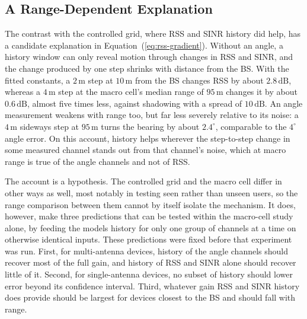 \subsection{A Range-Dependent Explanation}
\label{subsec:hypothesis}

The contrast with the controlled grid, where RSS and SINR history did help, has a candidate explanation in Equation~(\ref{eq:rss-gradient}). Without an angle, a history window can only reveal motion through changes in RSS and SINR, and the change produced by one step shrinks with distance from the BS. With the fitted constants, a $2\,\text{m}$ step at $10\,\text{m}$ from the BS changes RSS by about $2.8\,\text{dB}$, whereas a $4\,\text{m}$ step at the macro cell's median range of $95\,\text{m}$ changes it by about $0.6\,\text{dB}$, almost five times less, against shadowing with a spread of $10\,\text{dB}$. An angle measurement weakens with range too, but far less severely relative to its noise: a $4\,\text{m}$ sideways step at $95\,\text{m}$ turns the bearing by about $2.4^\circ$, comparable to the $4^\circ$ angle error. On this account, history helps wherever the step-to-step change in some measured channel stands out from that channel's noise, which at macro range is true of the angle channels and not of RSS.

The account is a hypothesis. The controlled grid and the macro cell differ in other ways as well, most notably in testing seen rather than unseen users, so the range comparison between them cannot by itself isolate the mechanism. It does, however, make three predictions that can be tested within the macro-cell study alone, by feeding the models history for only one group of channels at a time on otherwise identical inputs. These predictions were fixed before that experiment was run. First, for multi-antenna devices, history of the angle channels should recover most of the full gain, and history of RSS and SINR alone should recover little of it. Second, for single-antenna devices, no subset of history should lower error beyond its confidence interval. Third, whatever gain RSS and SINR history does provide should be largest for devices closest to the BS and should fall with range.
